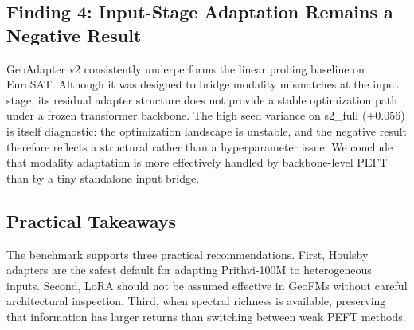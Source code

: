 \subsection{Finding 4: Input-Stage Adaptation Remains a Negative Result}
GeoAdapter v2 consistently underperforms the linear probing baseline on EuroSAT. Although it was designed to bridge modality mismatches at the input stage, its residual adapter structure does not provide a stable optimization path under a frozen transformer backbone. The high seed variance on s2\_full ($\pm 0.056$) is itself diagnostic: the optimization landscape is unstable, and the negative result therefore reflects a structural rather than a hyperparameter issue. We conclude that modality adaptation is more effectively handled by backbone-level PEFT than by a tiny standalone input bridge.

\subsection{Practical Takeaways}
The benchmark supports three practical recommendations. First, Houlsby adapters are the safest default for adapting Prithvi-100M to heterogeneous inputs. Second, LoRA should not be assumed effective in GeoFMs without careful architectural inspection. Third, when spectral richness is available, preserving that information has larger returns than switching between weak PEFT methods.
